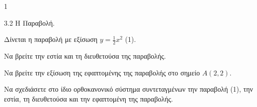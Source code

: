 \begin{ylh}{1}
    \item 3.2 Η Παραβολή.
\end{ylh}
Δίνεται η παραβολή με εξίσωση $y = \frac{1}{2}x^2$ (1).
\begin{alist}
\item Να βρείτε την εστία και τη διευθετούσα της παραβολής. 
\item Να βρείτε την εξίσωση της εφαπτομένης της παραβολής στο σημείο $A(2,2)$. 
\item Να σχεδιάσετε στο ίδιο ορθοκανονικό σύστημα συντεταγμένων την παραβολή (1), την εστία, τη διευθετούσα και την εφαπτομένη της παραβολής. 
\end{alist}